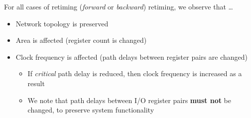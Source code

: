 \documentclass{article}
\begin{document}
For all cases of retiming (\textit{forward} or \textit{backward}) retiming, we observe that \dots
\begin{itemize}
    \item Network topology is preserved
    \item Area is affected (register count is changed)
    \item Clock frequency is affected (path delays between register pairs are changed)
        \begin{itemize}
            \item If \textit{critical} path delay is reduced, then clock frequency is increased as a result
            \item We note that path delays between I/O register pairs \textbf{must not} be changed, to preserve system functionality
        \end{itemize}
\end{itemize}
\end{document}
